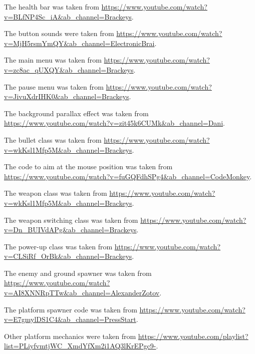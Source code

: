 \documentclass{article}
\begin{document}
The health bar was taken from \url{https://www.youtube.com/watch?v=BLfNP4Sc_iA&ab_channel=Brackeys}.

The button sounds were taken from \url{https://www.youtube.com/watch?v=MjH5rsmYmQY&ab_channel=ElectronicBrai}.

The main menu was taken from \url{https://www.youtube.com/watch?v=zc8ac_qUXQY&ab_channel=Brackeys}.

The pause menu was taken from \url{https://www.youtube.com/watch?v=JivuXdrIHK0&ab_channel=Brackeys}.

The background parallax effect was taken from \url{https://www.youtube.com/watch?v=zit45k6CUMk&ab_channel=Dani}.

The bullet class was taken from \url{https://www.youtube.com/watch?v=wkKsl1Mfp5M&ab_channel=Brackeys}.

The code to aim at the mouse position was taken from \url{https://www.youtube.com/watch?v=fuGQFdhSPg4&ab_channel=CodeMonkey}.

The weapon class was taken from \url{https://www.youtube.com/watch?v=wkKsl1Mfp5M&ab_channel=Brackeys}.

The weapon switching class was taken from \url{https://www.youtube.com/watch?v=Dn_BUIVdAPg&ab_channel=Brackeys}.

The power-up class was taken from \url{https://www.youtube.com/watch?v=CLSiRf_OrBk&ab_channel=Brackeys}.

The enemy and ground spawner was taken from \url{https://www.youtube.com/watch?v=AI8XNNRpTTw&ab_channel=AlexanderZotov}.

The platform spawner code was taken from \url{https://www.youtube.com/watch?v=E7gmylDS1C4&ab_channel=PressStart}.

Other platform mechanics were taken from \url{https://www.youtube.com/playlist?list=PLiyfvmtjWC_XmdYfXm2i1AQ3lKrEPgc9-}.
\end{document}
